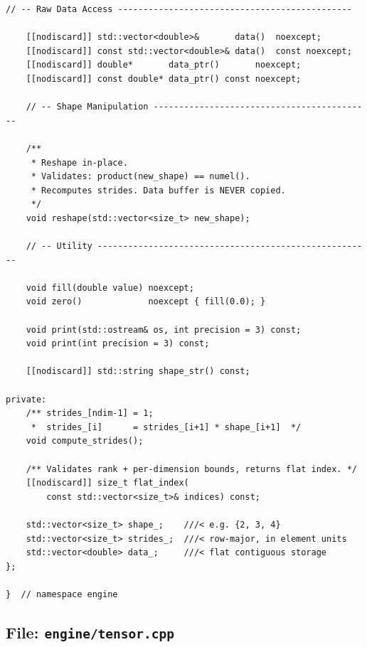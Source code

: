 \documentclass[12pt, a4paper]{article}
\begin{document}
\begin{lstlisting}[caption={\texttt{engine/tensor.hpp} - complete header}]
    // -- Raw Data Access ----------------------------------------------

    [[nodiscard]] std::vector<double>&       data()  noexcept;
    [[nodiscard]] const std::vector<double>& data()  const noexcept;
    [[nodiscard]] double*       data_ptr()       noexcept;
    [[nodiscard]] const double* data_ptr() const noexcept;

    // -- Shape Manipulation -------------------------------------------

    /**
     * Reshape in-place.
     * Validates: product(new_shape) == numel().
     * Recomputes strides. Data buffer is NEVER copied.
     */
    void reshape(std::vector<size_t> new_shape);

    // -- Utility ------------------------------------------------------

    void fill(double value) noexcept;
    void zero()             noexcept { fill(0.0); }

    void print(std::ostream& os, int precision = 3) const;
    void print(int precision = 3) const;

    [[nodiscard]] std::string shape_str() const;

private:
    /** strides_[ndim-1] = 1;
     *  strides_[i]      = strides_[i+1] * shape_[i+1]  */
    void compute_strides();

    /** Validates rank + per-dimension bounds, returns flat index. */
    [[nodiscard]] size_t flat_index(
        const std::vector<size_t>& indices) const;

    std::vector<size_t> shape_;    ///< e.g. {2, 3, 4}
    std::vector<size_t> strides_;  ///< row-major, in element units
    std::vector<double> data_;     ///< flat contiguous storage
};

}  // namespace engine
\end{lstlisting}

\newpage
\subsection{File: \texttt{engine/tensor.cpp}}
\end{document}
